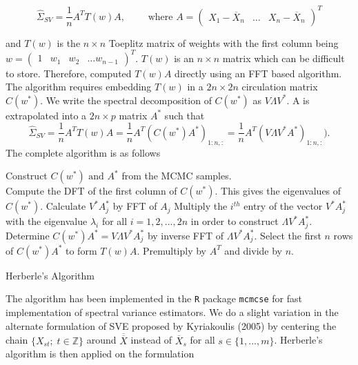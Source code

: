 \documentclass[11pt]{article}
\theoremstyle{remark}
\begin{document}
\begin{equation} \label{eq:Kyriakoulis_sv}
    \hat{\Sigma}_{SV} = \dfrac{1}{n}A^T T(w) A, \qquad \textrm{ where } A = \begin{pmatrix}
    X_1 - \overline{X}_n  & \dots & X_n - \overline{X}_n
\end{pmatrix}^T
\end{equation}

and $T(w)$ is the $n \times n$ Toeplitz matrix of weights with the first column being $w = 
\begin{pmatrix}
    1 & w_1 & w_2 & \dots w_{n-1}
\end{pmatrix}^T$.
$T(w)$ is an $n \times n$ matrix which can be difficult to store. Therefore, \cite{heberle2017fast} computed $T(w)A$ directly using an FFT based algorithm. The algorithm requires embedding $T(w)$ in a $2n \times 2n$ circulation matrix $C(w^*)$. We write the spectral decomposition of $C(w^*)$ as $V\Lambda V^*$. A is extrapolated into a $2n \times p$ matrix $A^*$ such that
\[
    \hat{\Sigma}_{SV} = \dfrac{1}{n} A^T T(w) A = \dfrac{1}{n} A^T (C(w^*) A^*)_{1:n, :} = \dfrac{1}{n} A^T (V \Lambda V^* A^*)_{1:n, :}).
\]
The complete algorithm is as follows
\\
\begin{algorithm}[H]
\DontPrintSemicolon
\SetAlgoLined

Construct $C(w^*) \textrm{ and } A^*$ from the MCMC samples.\\ Compute the DFT of the first column of $C(w^*)$. This gives the eigenvalues of $C(w^*)$.\;
    { 
    Calculate $V^*A_j^*$ by FFT of $A_j$\;
    Multiply the $i^{th}$ entry of the vector $V^* A_j^*$ with the eigenvalue $\lambda_i$ for all $i = 1, 2, ..., 2n$ in order to construct $\Lambda V^* A_j^*$.\;
    Determine $C(w^*)A^* = V \Lambda V^* A_j^*$ by inverse FFT of $\Lambda V^* A_j^*$.\;
    }
 Select the first $n$ rows of $C(w^*)A^*$ to form $T(w)A$.\;
 Premultiply by $A^T$ and divide by $n$.
 \caption{Herberle's Algorithm}
\end{algorithm}

The algorithm has been implemented in the \texttt{R} package \texttt{mcmcse} for fast implementation of spectral variance estimators. We do a slight variation in the alternate formulation of SVE proposed by Kyriakoulis (2005) by centering the chain $\{X_{st}; \; t \in \mathbb{Z}\}$ around $\overline{\overline{X}}$ instead of $\overline{X}_s$ for all $s \in \{1, ..., m\}$. Herberle's algorithm is then applied on the formulation
\end{document}
